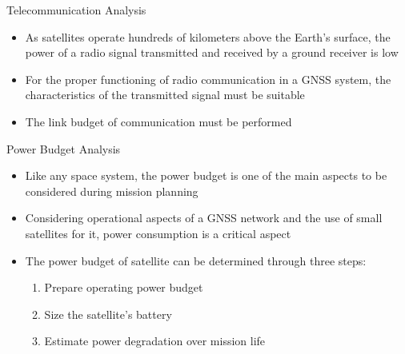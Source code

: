 \begin{frame}{Telecommunication Analysis}

    \begin{itemize}
        \item As satellites operate hundreds of kilometers above the Earth's surface, the power of a radio signal transmitted and received by a ground receiver is low
        \vspace{0.3cm}
        \item For the proper functioning of radio communication in a GNSS system, the characteristics of the transmitted signal must be suitable
        \vspace{0.3cm}
        \item The link budget of communication must be performed
    \end{itemize}

\end{frame}

\begin{frame}{Power Budget Analysis}

    \begin{itemize}
        \item Like any space system, the power budget is one of the main aspects to be considered during mission planning
        \vspace{0.1cm}
        \item Considering operational aspects of a GNSS network and the use of small satellites for it, power consumption is a critical aspect
        \vspace{0.1cm}
        \item The power budget of satellite can be determined through three steps:
            \begin{enumerate}
                \item Prepare operating power budget
                \item Size the satellite's battery
                \item Estimate power degradation over mission life
            \end{enumerate}
    \end{itemize}

\end{frame}


